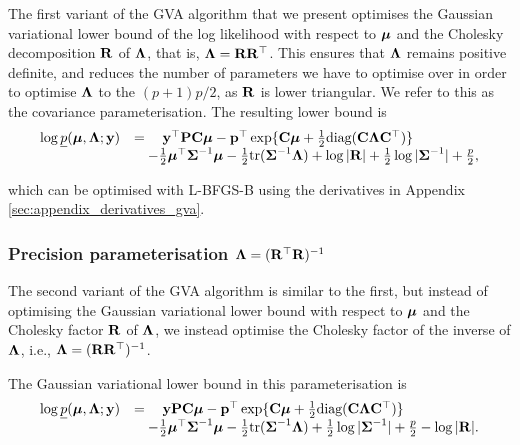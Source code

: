 The first variant of the GVA algorithm that we
present optimises the Gaussian variational lower bound of the log likelihood
with respect to ${\boldsymbol \mu}$ and the Cholesky decomposition ${\bf R}$ of ${\boldsymbol \Lambda}$, that
is, ${\boldsymbol \Lambda} = {\bf R} {\bf R}^\top$. This ensures that ${\boldsymbol \Lambda}$ remains positive
definite, and reduces the number of parameters we have to optimise over in
order to optimise ${\boldsymbol \Lambda}$ to the $(p + 1) p / 2$, as ${\bf R}$ is lower
triangular.	We refer to this as the covariance parameterisation. The resulting
lower bound is
\begin{equation}
\label{eq:gva_lower_bound_cov_param}
\begin{array}{ll}
	\log \underline{p}({\boldsymbol \mu}, {\boldsymbol \Lambda}; {\bf y}) & = \quad {\bf y}^\top{\bf P} {\bf C} {\boldsymbol\mu} - {\bf p}^\top \exp\{{\bf C} {\boldsymbol \mu} + \tfrac{1}{2} \text{diag}({\bf C} {\boldsymbol \Lambda} {\bf C}^\top)\} \\
	& \quad - \tfrac{1}{2} {\boldsymbol \mu}^\top {\boldsymbol\Sigma}^{-1} {\boldsymbol \mu} - \tfrac{1}{2} \text{tr}{({\boldsymbol\Sigma}^{-1} {\boldsymbol\Lambda})} + \log{|{\bf R}|}
	                                        + \tfrac{1}{2} \log{|{\boldsymbol\Sigma}^{-1}|} + \tfrac{p}{2},                                                                              
\end{array}
\end{equation}

\noindent which can be optimised with L-BFGS-B using the derivatives in
Appendix \ref{sec:appendix_derivatives_gva}.
	
\subsubsection{Precision parameterisation ${\boldsymbol \Lambda} = ({\bf R}^\top {\bf R})^{-1}$}
		
\noindent The second variant of the GVA
algorithm is similar to the first, but instead of optimising the Gaussian
variational lower bound with respect to ${\boldsymbol \mu}$ and the Cholesky factor ${\bf R}$ of
${\boldsymbol \Lambda}$, we instead optimise the Cholesky factor of the inverse of
${\boldsymbol \Lambda}$, i.e., ${\boldsymbol \Lambda} = ({\bf R} {\bf R}^\top)^{-1}$.

The Gaussian variational lower bound in this parameterisation is
\begin{equation}
\label{eq:gva_lower_bound_precision_param}
\begin{array}{ll}
	\log \underline{p}({\boldsymbol \mu}, {\boldsymbol \Lambda}; {\bf y}) & = \quad {\bf y}{\bf P}{\bf C} {\boldsymbol\mu} - {\bf p}^\top \exp\{{\bf C} {\boldsymbol \mu} + \tfrac{1}{2} \text{diag}({\bf C} {\boldsymbol \Lambda} {\bf C}^\top)\} \\
	&\quad - \tfrac{1}{2} {\boldsymbol \mu}^\top {\boldsymbol\Sigma}^{-1} {\boldsymbol \mu} - \tfrac{1}{2} \text{tr}{({\boldsymbol\Sigma}^{-1} {\boldsymbol\Lambda})}
        + \tfrac{1}{2} \log{|{\boldsymbol\Sigma}^{-1}|} + \tfrac{p}{2} - \log{|{\bf R}|}.
\end{array}
\end{equation}
		
